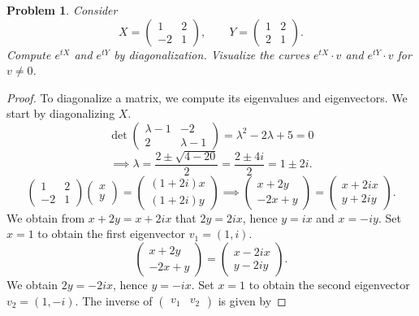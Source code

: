 \documentclass[11pt, letterpaper]{article}
\theoremstyle{plain}
\newtheorem{problem}{Problem}
\begin{document}
\begin{problem}
	Consider
	\[
		X=\begin{pmatrix}
		1 & 2 \\
		-2 & 1
		\end{pmatrix},\qquad Y=\begin{pmatrix}
		1 & 2 \\
		2 & 1
		\end{pmatrix}
	.\]
	Compute $e^{tX} $ and $e^{tY} $ by diagonalization. Visualize the curves $e^{tX} \cdot v$ and $e^{tY} \cdot v$ for $v\neq 0$.
\end{problem}
\begin{proof}
	To diagonalize a matrix, we compute its eigenvalues and eigenvectors. We start by diagonalizing $X$.
	\[
		\det \begin{pmatrix}
		\lambda -1 & -2 \\
		2 & \lambda -1
		\end{pmatrix}=\lambda ^2-2\lambda +5=0
	\]
	\[
		\implies \lambda =\frac{2\pm \sqrt{4-20} }{2} =\frac{2\pm 4i}{2} =1\pm 2i
	.\]
	\[
		\begin{pmatrix}
		1 & 2 \\
		-2 & 1
		\end{pmatrix}\begin{pmatrix}
		x \\
		y
	\end{pmatrix}=\begin{pmatrix}
	(1+2i)x \\
	(1+2i)y
	\end{pmatrix}\implies \begin{pmatrix}
	x+2y \\
	-2x+y
	\end{pmatrix}=\begin{pmatrix}
	x+2ix \\
	y+2iy
	\end{pmatrix}
	.\]
	We obtain from $x+2y=x+2ix$ that $2y=2ix$, hence $y=ix$ and $x=-iy$. Set $x=1$ to obtain the first eigenvector $v_1=(1,i)$.
	\[
		\begin{pmatrix}
		x+2y \\
		-2x+y
		\end{pmatrix}=\begin{pmatrix}
		x-2ix \\
		y-2iy
		\end{pmatrix}
	.\]
	We obtain $2y=-2ix$, hence $y=-ix$. Set $x=1$ to obtain the second eigenvector $v_2=(1,-i)$. The inverse of $\begin{pmatrix}
	v_1 & v_2
	\end{pmatrix}$ is given by

\end{proof}
\end{document}
